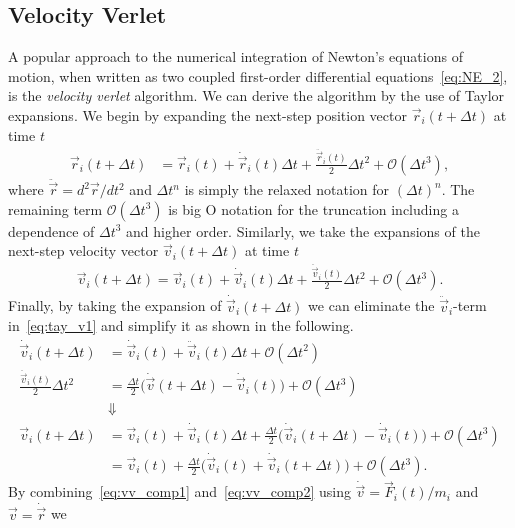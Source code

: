 \subsection{Velocity Verlet}
A popular approach to the numerical integration of Newton's equations of motion, when written as two coupled first-order differential equations~\cref{eq:NE_2}, is the \textit{velocity verlet} algorithm. We can derive the algorithm by the use of Taylor expansions. We begin by expanding the next-step position vector $\vec{r}_i(t + \Delta t)$ at time $t$
\begin{align}
  \vec{r}_i(t + \Delta t) &= \vec{r}_i(t) + \dot{\vec{r}}_i(t) \Delta t + \frac{\ddot{\vec{r}}_i(t)}{2} \Delta t^2 + \mathcal{O}(\Delta t^3) \label{eq:vv_comp1},
\end{align}
where $\ddot{\vec{r}} = d^2\vec{r}/dt^2$ and $\Delta t^n$ is simply the relaxed
notation for $(\Delta t)^n$. The remaining term $\mathcal{O}(\Delta t^3)$ is big O notation for the truncation including a dependence of $\Delta t^3$ and higher order. Similarly, we take the expansions of the next-step
velocity vector $\vec{v}_i(t+\Delta t)$ at time $t$ 
\begin{align}
  \vec{v}_i(t+\Delta t) = \vec{v}_i(t) + \dot{\vec{v}}_i(t) \Delta t + \frac{\ddot{\vec{v}}_i(t)}{2}\Delta t^2 + \mathcal{O}(\Delta t^3).
  \label{eq:tay_v1}
\end{align}
Finally, by taking the expansion of $\dot{\vec{v}}_i(t+\Delta t)$ we can
eliminate the $\ddot{\vec{v}}_i$-term in~\cref{eq:tay_v1} and simplify it as
shown in the following.
\begin{align}
  \dot{\vec{v}}_i(t+\Delta t) &= \dot{\vec{v}}_i(t) + \ddot{\vec{v}}_i(t) \Delta t + \mathcal{O}(\Delta t^2) \nonumber \\
  \frac{\ddot{\vec{v}}_i(t)}{2}\Delta t^2 &= \frac{\Delta t}{2}\Big( \dot{\vec{v}}(t+\Delta t) - \dot{\vec{v}}_i(t)\Big) + \mathcal{O}(\Delta t^3) \nonumber \\
  &\Downarrow \nonumber \\
  \vec{v}_i(t+\Delta t) &= \vec{v}_i(t) + \dot{\vec{v}}_i(t) \Delta t + \frac{\Delta t}{2}\Big( \dot{\vec{v}}_i(t+\Delta t) - \dot{\vec{v}}_i(t)\Big) + \mathcal{O}(\Delta t^3) \nonumber \\
  &=  \vec{v}_i(t) + \frac{\Delta t}{2}\Big( \dot{\vec{v}}_i(t) +  \dot{\vec{v}}_i(t+\Delta t)\Big) + \mathcal{O}(\Delta t^3).
  \label{eq:vv_comp2}
\end{align}
By combining~\cref{eq:vv_comp1} and~\cref{eq:vv_comp2} using $\dot{\vec{v}} = \vec{F}_i(t)/m_i$ and $\vec{v} = \dot{\vec{r}}$ we
